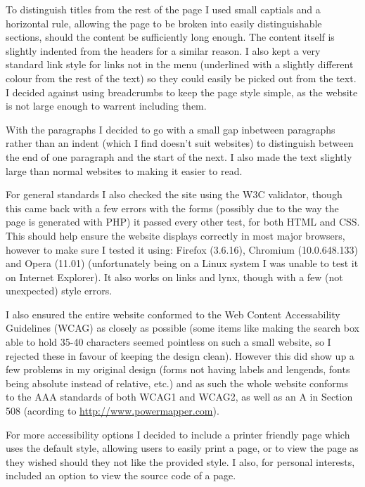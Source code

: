 \documentclass[10pt,letterpaper]{article}
\begin{document}
	To distinguish titles from the rest of the page I used small captials and a horizontal rule, allowing the page to be broken into easily distinguishable sections, should the content be sufficiently long enough. The content itself is slightly indented from the headers for a similar reason. I also kept a very standard link style for links not in the menu (underlined with a slightly different colour from the rest of the text) so they could easily be picked out from the text. I decided against using breadcrumbs to keep the page style simple, as the website is not large enough to warrent including them.

	With the paragraphs I decided to go with a small gap inbetween paragraphs rather than an indent (which I find doesn't suit websites) to distinguish between the end of one paragraph and the start of the next. I also made the text slightly large than normal websites to making it easier to read. 

	For general standards I also checked the site using the W3C validator, though this came back with a few errors with the forms (possibly due to the way the page is generated with PHP) it passed every other test, for both HTML and CSS. This should help ensure the website displays correctly in most major browsers, however to make sure I tested it using: Firefox (3.6.16), Chromium (10.0.648.133) and Opera (11.01) (unfortunately being on a Linux system I was unable to test it on Internet Explorer). It also works on links and lynx, though with a few (not unexpected) style errors.

	I also ensured the entire website conformed to the Web Content Accessability Guidelines (WCAG) as closely as possible (some items like making the search box able to hold 35-40 characters seemed pointless on such a small website, so I rejected these in favour of keeping the design clean). However this did show up a few problems in my original design (forms not having labels and lengends, fonts being absolute instead of relative, etc.) and as such the whole website conforms to the AAA standards of both WCAG1 and WCAG2, as well as an A in Section 508 (acording to \url{http://www.powermapper.com}).

	For more accessibility options I decided to include a printer friendly page which uses the default style, allowing users to easily print a page, or to view the page as they wished should they not like the provided style. I also, for personal interests, included an option to view the source code of a page.
\end{document}
